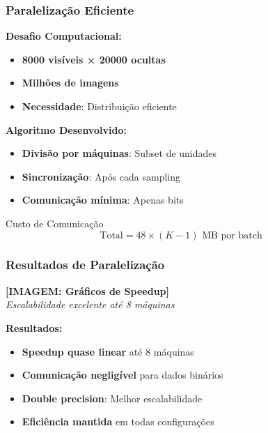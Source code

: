 \documentclass[aspectratio=169]{beamer}
\begin{document}
\begin{frame}
\frametitle{Paralelização Eficiente}
\textbf{Desafio Computacional:}
\begin{itemize}
    \item \textcolor{azulescuro}{\textbf{8000 visíveis × 20000 ocultas}}
    \item \textcolor{azulescuro}{\textbf{Milhões de imagens}}
    \item \textcolor{azulescuro}{\textbf{Necessidade}}: Distribuição eficiente
\end{itemize}

\textbf{Algoritmo Desenvolvido:}
\begin{itemize}
    \item \textcolor{azulescuro}{\textbf{Divisão por máquinas}}: Subset de unidades
    \item \textcolor{azulescuro}{\textbf{Sincronização}}: Após cada sampling
    \item \textcolor{azulescuro}{\textbf{Comunicação mínima}}: Apenas bits
\end{itemize}

\begin{exampleblock}{Custo de Comunicação}
\begin{equation}
\text{Total} = 48 \times (K-1) \text{ MB por batch}
\end{equation}
\end{exampleblock}
\end{frame}

\begin{frame}
\frametitle{Resultados de Paralelização}
\begin{center}
\textbf{[IMAGEM: Gráficos de Speedup]}\\
\textit{Escalabilidade excelente até 8 máquinas}
\end{center}

\textbf{Resultados:}
\begin{itemize}
    \item \textcolor{azulescuro}{\textbf{Speedup quase linear}} até 8 máquinas
    \item \textcolor{azulescuro}{\textbf{Comunicação negligível}} para dados binários
    \item \textcolor{azulescuro}{\textbf{Double precision}}: Melhor escalabilidade
    \item \textcolor{azulescuro}{\textbf{Eficiência mantida}} em todas configurações
\end{itemize}
\end{frame}
\end{document}
